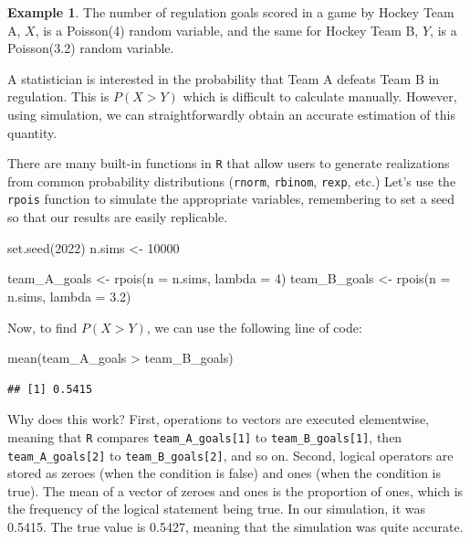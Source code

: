 \documentclass[
  11pt,
]{book}
\newenvironment{Shaded}{\begin{snugshade}}{\end{snugshade}}
\newcommand{\AttributeTok}[1]{\textcolor[rgb]{0.77,0.63,0.00}{#1}}
\newcommand{\DecValTok}[1]{\textcolor[rgb]{0.00,0.00,0.81}{#1}}
\newcommand{\FloatTok}[1]{\textcolor[rgb]{0.00,0.00,0.81}{#1}}
\newcommand{\FunctionTok}[1]{\textcolor[rgb]{0.00,0.00,0.00}{#1}}
\newcommand{\NormalTok}[1]{#1}
\newcommand{\OtherTok}[1]{\textcolor[rgb]{0.56,0.35,0.01}{#1}}
\newcommand{\SpecialCharTok}[1]{\textcolor[rgb]{0.00,0.00,0.00}{#1}}
\theoremstyle{definition}
\theoremstyle{definition}
\newtheorem{example}{Example}[chapter]
\theoremstyle{definition}
\theoremstyle{definition}
\theoremstyle{remark}
\begin{document}
\begin{example}
The number of regulation goals scored in a game by Hockey Team A, \(X\), is a Poisson(4) random variable, and the same for Hockey Team B, \(Y\), is a Poisson(3.2) random variable.

A statistician is interested in the probability that Team A defeats Team B in regulation. This is \(P(X>Y)\) which is difficult to calculate manually. However, using simulation, we can straightforwardly obtain an accurate estimation of this quantity.
\end{example}

There are many built-in functions in \texttt{R} that allow users to generate realizations from common probability distributions (\texttt{rnorm}, \texttt{rbinom}, \texttt{rexp}, etc.) Let's use the \texttt{rpois} function to simulate the appropriate variables, remembering to set a seed so that our results are easily replicable.

\begin{Shaded}
\begin{Highlighting}[]
\FunctionTok{set.seed}\NormalTok{(}\DecValTok{2022}\NormalTok{)}
\NormalTok{n.sims }\OtherTok{\textless{}{-}} \DecValTok{10000}

\NormalTok{team\_A\_goals }\OtherTok{\textless{}{-}} \FunctionTok{rpois}\NormalTok{(}\AttributeTok{n =}\NormalTok{ n.sims, }\AttributeTok{lambda =} \DecValTok{4}\NormalTok{)}
\NormalTok{team\_B\_goals }\OtherTok{\textless{}{-}} \FunctionTok{rpois}\NormalTok{(}\AttributeTok{n =}\NormalTok{ n.sims, }\AttributeTok{lambda =} \FloatTok{3.2}\NormalTok{)}
\end{Highlighting}
\end{Shaded}

Now, to find \(P(X > Y)\), we can use the following line of code:

\begin{Shaded}
\begin{Highlighting}[]
\FunctionTok{mean}\NormalTok{(team\_A\_goals }\SpecialCharTok{\textgreater{}}\NormalTok{ team\_B\_goals)}
\end{Highlighting}
\end{Shaded}

\begin{verbatim}
## [1] 0.5415
\end{verbatim}

Why does this work? First, operations to vectors are executed elementwise, meaning that \texttt{R} compares \texttt{team\_A\_goals{[}1{]}} to \texttt{team\_B\_goals{[}1{]}}, then \texttt{team\_A\_goals{[}2{]}} to \texttt{team\_B\_goals{[}2{]}}, and so on. Second, logical operators are stored as zeroes (when the condition is false) and ones (when the condition is true). The mean of a vector of zeroes and ones is the proportion of ones, which is the frequency of the logical statement being true. In our simulation, it was 0.5415. The true value is 0.5427, meaning that the simulation was quite accurate.
\end{document}
